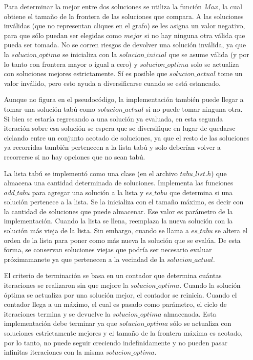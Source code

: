 \par{Para determinar la mejor entre dos soluciones se utiliza la función $Max$,
la cual obtiene el tamaño de la frontera de las soluciones que compara. A las
soluciones inválidas (que no representan cliques en el grafo) se les asigna
un valor negativo, para que sólo puedan ser elegidas como $mejor$ si no hay
ninguna otra válida que pueda ser tomada. No se corren riesgos de devolver una
solución inválida, ya que la $solucion\_optima$ se inicializa con la
$solucion\_inicial$ que se asume válida (y por lo tanto con frontera mayor o
igual a cero) y $solucion\_optima$ solo se actualiza con soluciones mejores
estrictamente. Sí es posible que $solucion\_actual$ tome un valor inválido,
pero esto ayuda a diversificarse cuando se está estancado.}\\

\par{Aunque no figura en el pseudocódigo, la implementación también puede
llegar a tomar una solución tabú como $solucion\_actual$ si no puede tomar
ninguna otra. Si bien se estaría regresando a una solución ya evaluada,
en esta segunda iteración sobre esa solución se espera que se diversifique
en lugar de quedarse ciclando entre un conjunto acotado de soluciones, ya
que el resto de las soluciones ya recorridas también pertenecen a la lista
tabú y solo deberían volver a recorrerse si no hay opciones que no sean
tabú.}\\

\par{La lista tabú se implementó como una clase (en el archivo $tabu\_list.h$)
que almacena una cantidad determinada de soluciones. Implementa las funciones
$add\_tabu$ para agregar una solución a la lista y $es\_tabu$ que determina si
una solución pertenece a la lista. Se la inicializa con el tamaño máximo, es
decir con la cantidad de soluciones que puede almacenar. Ese valor es
parámetro de la implementación. Cuando la lista se
llena, reemplaza la nueva solución con la solución más vieja de la lista.
Sin embargo, cuando se llama a $es\_tabu$ se altera el orden de la lista para
poner como más nueva la solución que se evalúa. De esta forma, se conservan
soluciones viejas que podría ser necesario evaluar próximamanete ya que
pertenecen a la vecindad de la $solucion\_actual$.}\\

\par{El criterio de terminación se basa en un contador que determina cuántas
iteraciones se realizaron sin que mejore la $solucion\_optima$. Cuando la
solución óptima se actualiza por una solución mejor, el contador se reinicia.
Cuando el contador llega a un máximo, el cual es pasado como parámetro, el
ciclo de iteraciones termina y se devuelve la $solucion\_optima$ almacenada.
Esta implementación debe terminar ya que $solucion\_optima$ sólo se actualiza
con soluciones estrictamente mejores y el tamaño de la frontera máxima es
acotado, por lo tanto, no puede seguir creciendo indefinidamente y no pueden
pasar infinitas iteraciones con la misma $solucion\_optima$.}

